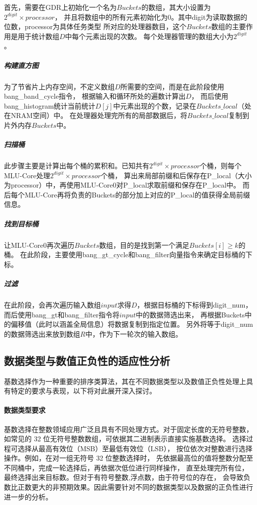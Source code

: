 首先，需要在GDR上初始化一个名为\(Buckets\)的数组，其大小设置为\(2^{digit} \times processor\)，
并且将数组中的所有元素初始化为\(0\)。其中digit为读取数据的位数，processor为具体任务类型
所对应的处理器数目，这个\(Buckets\)数组的主要作用是用于统计数组\(D\)中每个元素出现的次数。
每个处理器管理的数组大小为\(2^{digit}\)。
\subparagraph{构建直方图}

为了节省片上内存空间，不定义数组\(D\)所需要的空间，而是在此阶段使用bang\_band\_cycle指令，
根据输入和循环所处的遍数计算出\(D\)，
而后使用bang\_histogram统计当前统计\(D[j]\)中元素出现的个数，记录在\(Buckets\_local\)（处在NRAM空间）中。
在处理器处理完所有的局部数据后，将\(Buckets\_local\)复制到片外内存\(Buckets\)中。

\subparagraph{扫描桶}

此步骤主要是计算出每个桶的累积和。已知共有\(2^{digit} \times processor\)个桶，则每个MLU-Core处理\(2^{digit} \times processor\)个桶，
算出来局部前缀和后保存在P\_local（大小为processor）中，再使用MLU-Core0对P\_local求取前缀和保存在P\_local中。
而后每个MLU-Core再将负责的Buckets的部分加上对应的P\_local的值获得全局前缀信息。
\subparagraph{找到目标桶}

让MLU-Core0再次遍历\(Buckets\)数组，目的是找到第一个满足\(Buckets[i] \geq k\)的桶。
在此阶段，主要使用bang\_gt\_cycle和bang\_filter向量指令来确定目标桶的下标。

\subparagraph{过滤}

在此阶段，会再次遍历输入数组\(input\)求得\(D\)，根据目标桶的下标得到digit\_num，
而后使用bang\_gt和bang\_filter指令将\(input\)中的数据筛选出来，
再根据Buckets中的偏移值（此时以涵盖全局信息）将数据复制到指定位置。
另外将等于digit\_num的数据筛选出来放到数组\(R\)中，作为下一轮次的输入数组。


\subsection{数据类型与数值正负性的适应性分析}


基数选择作为一种重要的排序类算法，其在不同数据类型以及数值正负性处理上具有特定的要求与表现，以下将对此展开深入探讨。

\paragraph{数据类型要求}

基数选择在整数领域应用广泛且具有不同处理方式。对于固定长度的无符号整数，
如常见的 32 位无符号整数数组，可依据其二进制表示直接实施基数选择。
选择过程可选择从最高有效位（MSB）至最低有效位（LSB），
按位依次对整数进行选择操作。例如，在对一组无符号 32 位整数选择时，
先依据最高位的值将整数分配至不同桶中，完成一轮选择后，再依据次低位进行同样操作，
直至处理完所有位，最终选择出来目标数。但对于有符号整数,浮点数，由于符号位的存在，
会导致负数比正数更大的非预期效果。因此需要针对不同的数据类型以及数据的正负性进行
进一步的分析。

